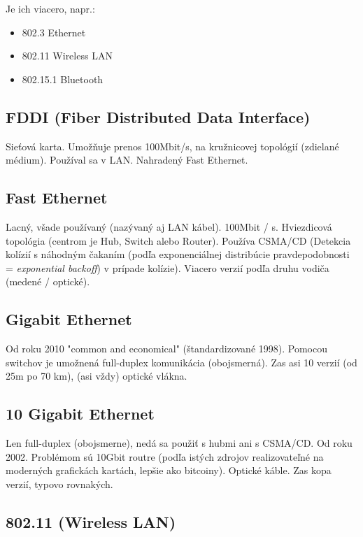 \documentclass[10pt,a4paper]{article}
\begin{document}
Je ich viacero, napr.:
\begin{itemize}
\item 802.3 Ethernet      
\item 802.11 Wireless LAN
\item 802.15.1 Bluetooth 
\end{itemize}

\subsection{FDDI (Fiber Distributed Data Interface)}  
Sieťová karta. Umožňuje prenos 100Mbit/s, na kružnicovej topológií (zdielané médium). Používal sa v LAN. Nahradený Fast Ethernet.    
                 
\subsection{Fast Ethernet}            
Lacný, všade používaný (nazývaný aj LAN kábel).
100Mbit / s. Hviezdicová topológia (centrom je Hub, Switch alebo Router).
Používa CSMA/CD (Detekcia kolízií s náhodným čakaním (podľa exponenciálnej distribúcie pravdepodobnosti = \emph{exponential backoff}) v prípade kolízie). Viacero verzií podľa druhu vodiča (medené / optické).

\subsection{Gigabit Ethernet}       
Od roku 2010 "common and economical" (štandardizované 1998). Pomocou switchov je umožnená full-duplex komunikácia (obojsmerná). 
Zas asi 10 verzií (od 25m po 70 km), (asi vždy) optické vlákna. 

\subsection{10 Gigabit Ethernet}  
Len full-duplex (obojsmerne), nedá sa použiť s hubmi ani s CSMA/CD. 
Od roku 2002. Problémom sú 10Gbit routre (podľa istých zdrojov realizovateľné na moderných grafickách kartách, lepšie ako bitcoiny). Optické káble. Zas kopa verzií, typovo rovnakých. 

\subsection{802.11 (Wireless LAN)}  
\end{document}
